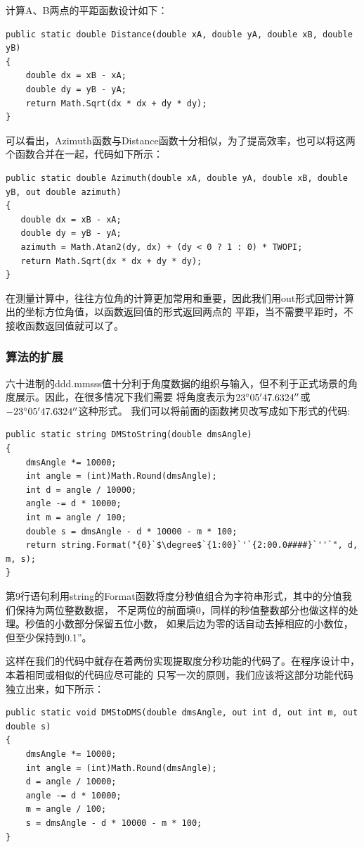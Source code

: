 计算A、B两点的平距函数设计如下：
\begin{lstlisting}
public static double Distance(double xA, double yA, double xB, double yB)
{
    double dx = xB - xA;
    double dy = yB - yA;
    return Math.Sqrt(dx * dx + dy * dy);
}
\end{lstlisting}

可以看出，Azimuth函数与Distance函数十分相似，为了提高效率，也可以将这两个函数合并在一起，代码如下所示：

\begin{lstlisting}
public static double Azimuth(double xA, double yA, double xB, double yB, out double azimuth)
{
   double dx = xB - xA;
   double dy = yB - yA;
   azimuth = Math.Atan2(dy, dx) + (dy < 0 ? 1 : 0) * TWOPI;
   return Math.Sqrt(dx * dx + dy * dy);
}
\end{lstlisting}

在测量计算中，往往方位角的计算更加常用和重要，因此我们用out形式回带计算出的坐标方位角值，以函数返回值的形式返回两点的
平距，当不需要平距时，不接收函数返回值就可以了。


\subsubsection{算法的扩展}

六十进制的ddd.mmsss值十分利于角度数据的组织与输入，但不利于正式场景的角度展示。因此，在很多情况下我们需要
将角度表示为$23^\circ 05'47.6324''$或$-23^\circ 05'47.6324''$这种形式。
我们可以将前面的函数拷贝改写成如下形式的代码:

\begin{lstlisting}
public static string DMStoString(double dmsAngle)
{
    dmsAngle *= 10000; 
    int angle = (int)Math.Round(dmsAngle);
    int d = angle / 10000;
    angle -= d * 10000;
    int m = angle / 100;
    double s = dmsAngle - d * 10000 - m * 100;
    return string.Format("{0}`$\degree$`{1:00}`'`{2:00.0####}`''`", d, m, s);
}
\end{lstlisting}

第9行语句利用string的Format函数将度分秒值组合为字符串形式，其中的分值我们保持为两位整数数据，
不足两位的前面填0，同样的秒值整数部分也做这样的处理。秒值的小数部分保留五位小数，
如果后边为零的话自动去掉相应的小数位，但至少保持到0.1''。

这样在我们的代码中就存在着两份实现提取度分秒功能的代码了。在程序设计中，本着相同或相似的代码应尽可能的
只写一次的原则，我们应该将这部分功能代码独立出来，如下所示：

\begin{lstlisting}
public static void DMStoDMS(double dmsAngle, out int d, out int m, out double s)
{
    dmsAngle *= 10000; 
    int angle = (int)Math.Round(dmsAngle);
    d = angle / 10000;
    angle -= d * 10000;
    m = angle / 100;
    s = dmsAngle - d * 10000 - m * 100;
}
\end{lstlisting}

